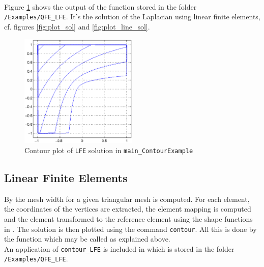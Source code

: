  \\
 \\
 \\

 Figure \ref{fig:plot_cont_sol} shows the output of the function  stored in the folder {\tt /Examples/QFE\_LFE}. It's the solution of the Laplacian using linear finite elements, cf. figures \ref{fig:plot_sol} and \ref{fig:plot_line_sol}.

\begin{figure}[htb]
  \centering
  \includegraphics[width=0.5\textwidth]{main_ContourExample.eps}
  \caption{Contour plot of {\tt LFE} solution in {\tt main\_ContourExample}}
  \label{fig:plot_cont_sol}
\end{figure}



\subsection{Linear Finite Elements} 

 By  the mesh width for a given triangular mesh is computed. For each element, the coordinates of the vertices are extracted, the element mapping is computed and the element transformed to the reference element using the shape functions in . The solution is then plotted using the \MATLAB command {\tt contour}. All this is done by the function  which may be called as explained above. \\

 An application of {\tt contour\_LFE} is included in  which is stored in the folder {\tt /Examples/QFE\_LFE}.


